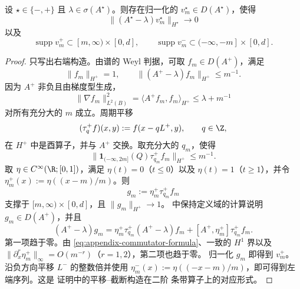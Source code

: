 \begin{lemma}
\label{lem:appendix-one-sided-Weyl}
设 $\star\in\{-,+\}$ 且
$\lambda\in\sigma(A^\star)$。则存在归一化的
$v_m^\star\in D(A^\star)$，使得
\[
  \|(A^\star-\lambda)v_m^\star\|_{H^\star}\longrightarrow0
\]
以及
\[
  \operatorname{supp}v_m^+\subset[m,\infty)\times[0,d],
  \qquad
  \operatorname{supp}v_m^-\subset(-\infty,-m]\times[0,d].
\]
\end{lemma}
\begin{proof}
只写出右端构造。由谱的 Weyl 判据，可取 $f_m\in D(A^+)$，满足
\[
  \|f_m\|_{H^+}=1,\qquad
  \|(A^+-\lambda)f_m\|_{H^+}\leq m^{-1}.
\]
因为 $A^+$ 非负且由梯度型生成，
\[
  \|\nabla f_m\|_{L^2(B)}^2
  =\langle A^+f_m,f_m\rangle_{H^+}
  \leq\lambda+m^{-1}
\]
对所有充分大的 $m$ 成立。周期平移
\[
  (\tau_q^+f)(x,y):=f(x-qL^+,y),\qquad q\in\Z,
\]
在 $H^+$ 中是酉算子，并与 $A^+$ 交换。取充分大的 $q_m$，使得
\[
  \bigl\|\mathbf 1_{(-\infty,2m]}(Q)\tau_{q_m}^+f_m
  \bigr\|_{H^+}\leq m^{-1}.
\]
取 $\eta\in C^\infty(\R;[0,1])$，满足
$\eta(t)=0$（$t\leq0$）以及 $\eta(t)=1$（$t\geq1$），并令
$\eta_m^+(x):=\eta((x-m)/m)$。则
\[
  g_m:=\eta_m^+\tau_{q_m}^+f_m
\]
支撑于 $[m,\infty)\times[0,d]$，且 $\|g_m\|_{H^+}\to1$。
 中保持定义域的计算说明
$g_m\in D(A^+)$，并且
\[
  (A^+-\lambda)g_m
  =\eta_m^+\tau_{q_m}^+(A^+-\lambda)f_m
   +[A^+,\eta_m^+]\tau_{q_m}^+f_m.
\]
第一项趋于零。由 \eqref{eq:appendix-commutator-formula}、一致的
$H^1$ 界以及
$\|\partial_x^r\eta_m^+\|_\infty=O(m^{-r})$（$r=1,2$），第二项也趋于零。
归一化 $g_m$ 即得到 $v_m^+$。沿负方向平移 $L^-$ 的整数倍并使用
$\eta_m^-(x):=\eta((-x-m)/m)$，即可得到左端序列。这是
\cite[Proposition~3.10]{DeNittisEtAl2021} 证明中的平移--截断构造在二阶
条带算子上的对应形式。
\end{proof}

